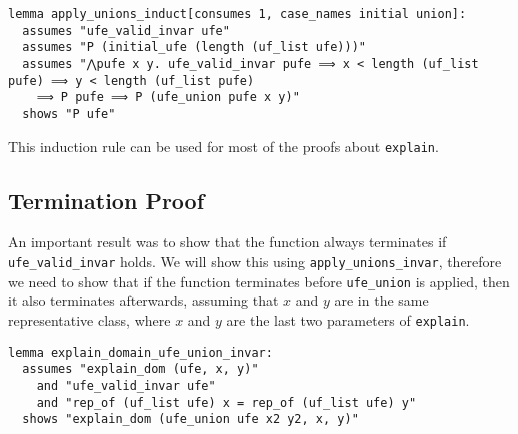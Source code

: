 \begin{lstlisting}
lemma apply_unions_induct[consumes 1, case_names initial union]:
  assumes "ufe_valid_invar ufe"
  assumes "P (initial_ufe (length (uf_list ufe)))"
  assumes "⋀pufe x y. ufe_valid_invar pufe ⟹ x < length (uf_list pufe) ⟹ y < length (uf_list pufe)
    ⟹ P pufe ⟹ P (ufe_union pufe x y)"
  shows "P ufe"
\end{lstlisting}

This induction rule can be used for most of the proofs about \lstinline|explain|.

\subsection{Termination Proof}
\label{subsection:termination}

An important result was to show that the function always terminates if \lstinline{ufe_valid_invar} holds. We will show this using \lstinline|apply_unions_invar|, therefore we need to show that if the function terminates before \lstinline{ufe_union} is applied, then it also terminates afterwards, assuming that $x$ and $y$ are in the same representative class, where $x$ and $y$ are the last two parameters of \lstinline|explain|.

\begin{lstlisting}
lemma explain_domain_ufe_union_invar:
  assumes "explain_dom (ufe, x, y)"
    and "ufe_valid_invar ufe"
    and "rep_of (uf_list ufe) x = rep_of (uf_list ufe) y"
  shows "explain_dom (ufe_union ufe x2 y2, x, y)"
\end{lstlisting}

